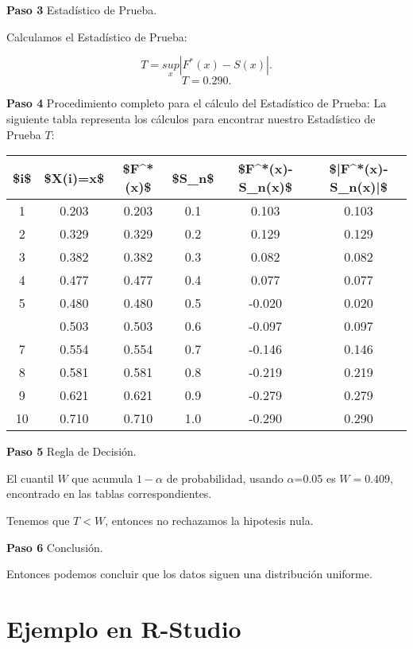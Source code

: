 \documentclass[
  a4paper,
  oneside,
  openany]{book}
\begin{document}
\textbf{Paso 3} Estadístico de Prueba.

Calculamos el Estadístico de Prueba:

\[T=\underset{x}{sup}|F^*(x)-S(x)|.\]
\[T=0.290.\]

\textbf{Paso 4} Procedimiento completo para el cálculo del Estadístico de Prueba:
La siguiente tabla representa los cálculos para encontrar nuestro Estadístico de Prueba \(T\):

\begin{table}
\centering
\begin{tabular}{cccccc}
\toprule
\$i\$ & \$X(i)=x\$ & \$F\textasciicircum{}*(x)\$ & \$S\_n\$ & \$F\textasciicircum{}*(x)-S\_n(x)\$ & \$|F\textasciicircum{}*(x)-S\_n(x)|\$\\
\midrule
1 & 0.203 & 0.203 & 0.1 & 0.103 & 0.103\\
2 & 0.329 & 0.329 & 0.2 & 0.129 & 0.129\\
3 & 0.382 & 0.382 & 0.3 & 0.082 & 0.082\\
4 & 0.477 & 0.477 & 0.4 & 0.077 & 0.077\\
5 & 0.480 & 0.480 & 0.5 & -0.020 & 0.020\\
\addlinespace
6 & 0.503 & 0.503 & 0.6 & -0.097 & 0.097\\
7 & 0.554 & 0.554 & 0.7 & -0.146 & 0.146\\
8 & 0.581 & 0.581 & 0.8 & -0.219 & 0.219\\
9 & 0.621 & 0.621 & 0.9 & -0.279 & 0.279\\
10 & 0.710 & 0.710 & 1.0 & -0.290 & 0.290\\
\bottomrule
\end{tabular}
\end{table}

\textbf{Paso 5} Regla de Decisión.

El cuantil \(W\) que acumula \(1-\alpha\) de probabilidad, usando \(\alpha\)=0.05 es \(W=0.409\), encontrado en las tablas correspondientes.

Tenemos que \(T<W\), entonces no rechazamos la hipotesis nula.

\textbf{Paso 6} Conclusión.

Entonces podemos concluir que los datos siguen una distribución uniforme.

\hypertarget{ejemplo-en-r-studio-14}{%
\section{Ejemplo en R-Studio}\label{ejemplo-en-r-studio-14}}
\end{document}
